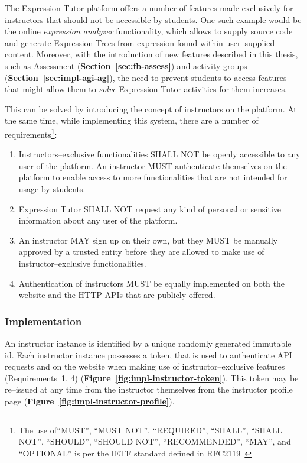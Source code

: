 \begin{chapterBody}
The Expression Tutor platform offers a number of features made exclusively for
instructors that should not be accessible by students. One such example would
be the online \textit{expression analyzer} functionality, which allows to
supply source code and generate Expression Trees from expression found within
user–supplied content.
Moreover, with the introduction of new features described in this thesis, such
as Assessment (\textbf{Section~\ref{sec:fb-assess}}) and activity groups
(\textbf{Section~\ref{sec:impl-agi-ag}}), the need to prevent students to access
features that might allow them to \textit{solve} Expression Tutor activities
for them increases.

This can be solved by introducing the concept of instructors on the 
platform. At the same time, while implementing this system, there are a number
of requirements\footnote{The use of``MUST'', ``MUST NOT'', ``REQUIRED'',
``SHALL'', ``SHALL NOT'', ``SHOULD'', ``SHOULD NOT'', ``RECOMMENDED'', ``MAY'',
and ``OPTIONAL'' is per the IETF standard defined in 
RFC2119~\cite{bradner_key_1997}}:

\begin{enumerate}
    \item Instructors–exclusive functionalities SHALL NOT be openly accessible
to any user of the platform. An instructor MUST authenticate themselves on the
platform to enable access to more functionalities that are not intended for
usage by students.
    \item Expression Tutor SHALL NOT request any kind of personal or sensitive
information about any user of the platform.
    \item An instructor MAY sign up on their own, but they MUST be manually
approved by a trusted entity before they are allowed to make use of 
instructor–exclusive functionalities. 
    \item Authentication of instructors MUST be equally implemented on both
the website and the HTTP APIs that are publicly offered.
\end{enumerate}

\subsubsection*{Implementation}

An instructor instance is identified by a unique randomly generated  immutable 
id. Each instructor instance possesses a token, that is used to authenticate API
requests and on the website when making use of instructor–exclusive features
(Requirements~1, 4) (\textbf{Figure~\ref{fig:impl-instructor-token}}). This
token may be re–issued at any time from the instructor themselves from the
instructor profile page (\textbf{Figure~\ref{fig:impl-instructor-profile}}).


\end{chapterBody}
